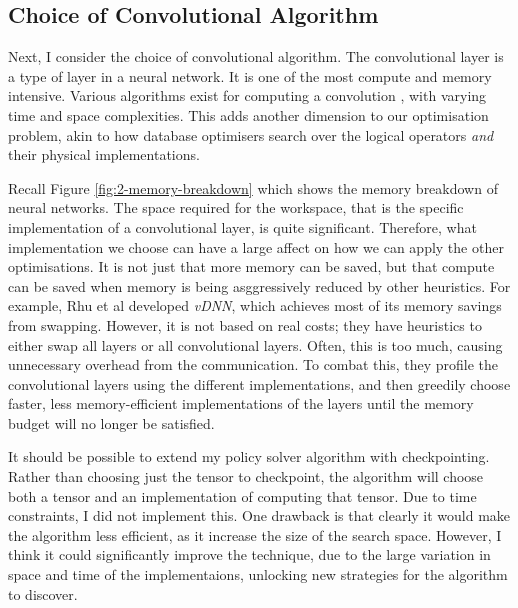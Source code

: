 \subsection{Choice of Convolutional Algorithm}
Next, I consider the choice of convolutional algorithm.
The convolutional layer is a type of layer in a neural network.
It is one of the most compute and memory intensive.
Various algorithms exist for computing a convolution \cite{Xu2018-convs, Li2016-convs}, with varying time and space complexities.
This adds another dimension to our optimisation problem, akin to how database optimisers search over the logical operators \textit{and} their physical implementations.

Recall Figure \ref{fig:2-memory-breakdown} which shows the memory breakdown of neural networks.
The space required for the workspace, that is the specific implementation of a convolutional layer, is quite significant.
Therefore, what implementation we choose can have a large affect on how we can apply the other optimisations.
It is not just that more memory can be saved, but that compute can be saved when memory is being asggressively reduced by other heuristics.
For example, Rhu et al \cite{Rhu2016} developed \textit{vDNN}, which achieves most of its memory savings from swapping.
However, it is not based on real costs; they have heuristics to either swap all layers or all convolutional layers.
Often, this is too much, causing unnecessary overhead from the communication.
To combat this, they profile the convolutional layers using the different implementations, and then greedily choose faster, less memory-efficient implementations of the layers until the memory budget will no longer be satisfied.

It should be possible to extend my policy solver algorithm with checkpointing.
Rather than choosing just the tensor to checkpoint, the algorithm will choose both a tensor and an implementation of computing that tensor.
Due to time constraints, I did not implement this.
One drawback is that clearly it would make the algorithm less efficient, as it increase the size of the search space.
However, I think it could significantly improve the technique, due to the large variation in space and time of the implementaions, unlocking new strategies for the algorithm to discover.
